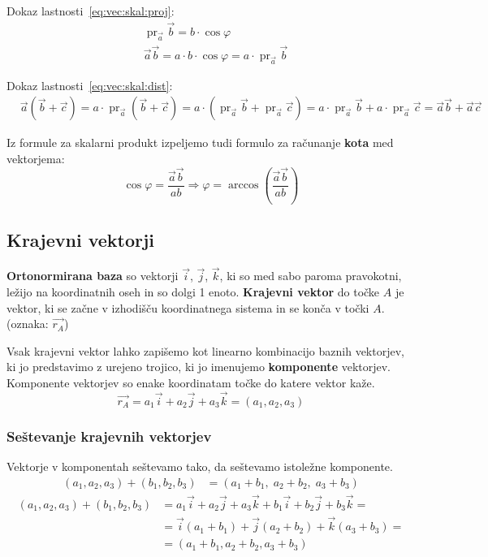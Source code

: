 \documentclass[a4paper,oneside,12pt,fleqn]{article}
\newcommand\krat\cdot
\newcommand{\pr}{\ensuremath{\operatorname{pr}}} %
\def\kos{\cos}
\def\Vec{\overrightarrow}
\renewcommand\implies\Rightarrow
\numberwithin{equation}{section}
\begin{document}
Dokaz lastnosti~\ref{eq:vec:skal:proj}:
\begin{align*}
  &\pr_{\vec{a}}\vec{b} = b\krat\kos\varphi \\
  &\vec{a}\vec{b} = a\krat b\krat\kos\varphi = a \krat\pr_{\vec{a}}\vec{b}
\end{align*}

Dokaz lastnosti~\ref{eq:vec:skal:dist}:
\begin{align*}
  &\vec{a}(\vec{b} + \vec{c}) = a\krat\pr_{\vec{a}}(\vec{b}+\vec{c}) =
  a\krat(\pr_{\vec{a}}\vec{b} + \pr_{\vec{a}}\vec{c}) = 
  a\krat\pr_{\vec{a}}\vec{b} + a\krat\pr_{\vec{a}}\vec{c} = \vec{a}\vec{b} +
  \vec{a}\vec{c}
\end{align*}

Iz formule za skalarni produkt izpeljemo tudi formulo za računanje \textbf{kota} med vektorjema:
\[ \kos\varphi = \frac{\vec{a}\vec{b}}{ab} \implies \varphi = \arccos\left( 
\frac{\vec{a}\vec{b}}{ab} \right) \]

\subsection{Krajevni vektorji}
\label{sec:vec:kraj}
\textbf{Ortonormirana baza} so vektorji $\vec{i}$, $\vec{j}$, $\vec{k}$,
ki so med sabo paroma pravokotni, ležijo na koordinatnih oseh in so dolgi 1 enoto.
\textbf{Krajevni vektor} do točke $A$ je vektor, ki se začne v izhodišču koordinatnega sistema in se
konča v točki $A$. (oznaka: $\Vec{r_A}$)

Vsak krajevni vektor lahko zapišemo kot linearno kombinacijo baznih vektorjev, ki jo
predstavimo z urejeno trojico, ki jo imenujemo \textbf{komponente} vektorjev. 
Komponente vektorjev so enake koordinatam točke do katere vektor kaže.
\[ \Vec{r_A} = a_1\vec{i} + a_2\vec{j} + a_3\vec{k} = (a_1,a_2,a_3) \]

\subsubsection{Seštevanje krajevnih vektorjev}
\label{sec:vec:kraj:sest}
Vektorje v komponentah seštevamo tako, da seštevamo istoležne komponente.
\boldmath
\begin{align*}
  (a_1,a_2,a_3) + (b_1,b_2,b_3) &=  (a_1+b_1,\;a_2+b_2,\;a_3+b_3)
\end{align*}
\unboldmath
\begin{align*}
  (a_1,a_2,a_3) + (b_1,b_2,b_3) &=  a_1\vec{i} + a_2\vec{j} + a_3\vec{k} + b_1\vec{i} +
  b_2\vec{j} + b_3\vec{k}=\\ &= 
  \vec{i}(a_1 + b_1) + \vec{j}(a_2+b_2) + \vec{k}(a_3+b_3) =\\&=  (a_1+b_1,a_2+b_2,a_3+b_3)
\end{align*}
\end{document}
